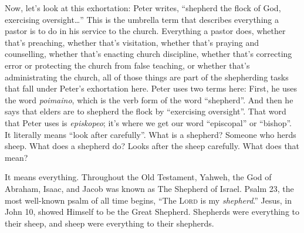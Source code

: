 \documentclass[letterpaper, 12pt]{article}
\begin{document}
    Now, let's look at this exhortation: Peter writes, ``shepherd the
    flock of God, exercising oversight\ldots'' This is the umbrella term
    that describes everything a pastor is to do in his service to the
    church. Everything a pastor does, whether that's preaching, whether
    that's visitation, whether that's praying and counselling, whether
    that's enacting church discipline, whether that's correcting error
    or protecting the church from false teaching, or whether that's
    administrating the church, all of those things are part of the
    shepherding tasks that fall under Peter's exhortation here. Peter
    uses two terms here: First, he uses the word \emph{poimaino}, which
    is the verb form of the word ``shepherd''.  And then he says that
    elders are to shepherd the flock by ``exercising oversight''. That
    word that Peter uses is \emph{episkopeo}; it's where we get our word
    ``episcopal'' or ``bishop''. It literally means ``look after
    carefully''. What is a shepherd? Someone who herds sheep.  What does
    a shepherd do? Looks after the sheep carefully. What does that mean?

    It means everything. Throughout the Old Testament, Yahweh, the God
    of Abraham, Isaac, and Jacob was known as The Shepherd of Israel.
    Psalm 23, the most well-known psalm of all time begins, ``The
    L\textsc{ord} is my \emph{shepherd}.'' Jesus, in John 10, showed
    Himself to be the Great Shepherd. Shepherds were everything to their
    sheep, and sheep were everything to their shepherds. 
\end{document}
